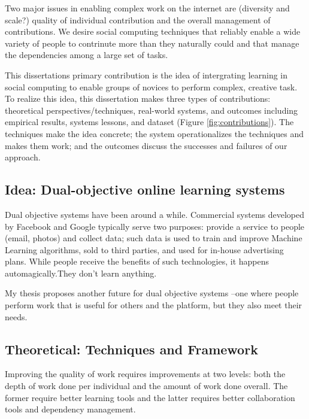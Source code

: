 Two major issues in enabling complex work on the internet are (diversity and scale?) quality of individual contribution and the overall management of contributions.  We desire social computing techniques that reliably enable a wide variety of people to contrinute more than they naturally could and that manage the dependencies among a large set of tasks.

This dissertation\textquotesingle s primary contribution is the idea of intergrating learning in social computing to enable groups of novices to perform complex, creative task. To realize this idea, this dissertation makes three types of contributions: theoretical perspectives/techniques, real-world systems, and outcomes including empirical results, systems lessons, and dataset (Figure \ref{fig:contributions}). The techniques make the idea concrete; the system operationalizes the techniques and makes them work; and the outcomes discuss the successes and failures of our approach.



\subsection{Idea: Dual-objective online learning systems}
Dual objective systems have been around  a while. Commercial systems developed by Facebook and Google typically serve two purposes: provide a service to people (email, photos) and collect data; such data is used to train and improve Machine Learning algorithms, sold to third parties, and used for in-house advertising plans. While people receive the benefits of such technologies, it happens automagically.They don\textquotesingle 't learn anything.

My thesis proposes another future for dual objective systems --one where people perform work that is useful for others and the platform, but they also meet their needs. 

\subsection{Theoretical: Techniques and Framework}
Improving the quality of work requires improvements at two levels: both the depth of work done per individual and the amount of work done overall. The former require better learning tools and the latter requires better collaboration tools and dependency management. 

